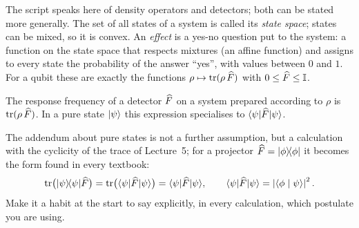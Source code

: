 \begin{webonly}
The script speaks here of density operators and detectors; both can be stated more generally. The set of all states of a system is called its \emph{state space}; states can be mixed, so it is convex. An \emph{effect} is a yes-no question put to the system: a function on the state space that respects mixtures (an affine function) and assigns to every state the probability of the answer ``yes'', with values between $0$ and $1$. For a qubit these are exactly the functions $\rho\mapsto\operatorname{tr}(\rho\,\widehat{F})$ with $0\leq\widehat{F}\leq\mathbb{I}$.
\end{webonly}


\begin{merksatz}[P4]
	The response frequency of a detector $\widehat{F}$ on a system prepared according to $\rho$ is $\operatorname{tr}(\rho\,\widehat{F})$. In a pure state $\lvert \psi \rangle$ this expression specialises to $\langle \psi \rvert \widehat{F} \lvert \psi \rangle$.
\end{merksatz}
The addendum about pure states is not a further assumption, but a calculation with the cyclicity of the trace of Lecture~5; for a projector $\widehat{F} = \lvert \phi \rangle\!\langle \phi \rvert$ it becomes the form found in every textbook:
\begin{equation}
	\operatorname{tr}\bigl(\lvert \psi \rangle\!\langle \psi \rvert\widehat{F}\bigr) = \operatorname{tr}\bigl(\langle \psi \rvert\widehat{F}\lvert \psi \rangle\bigr) = \langle \psi \rvert \widehat{F} \lvert \psi \rangle, \qquad \langle \psi \rvert \widehat{F} \lvert \psi \rangle = \left\lvert \langle \phi \mid \psi \rangle \right\rvert^2.
\end{equation}
Make it a habit at the start to say explicitly, in every calculation, which postulate you are using.

